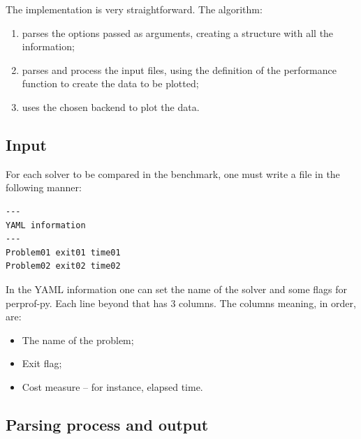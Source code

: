     The implementation is very straightforward. The algorithm:
    \begin{enumerate}
      \item parses the options passed as arguments, creating a
        structure with all the information;
      \item parses and process the input files, using the definition
        of the performance function to create the data to be plotted;
      \item uses the chosen backend to plot the data.
    \end{enumerate}

\subsection*{Input}

    For each solver to be compared in the benchmark, one must write a file in
    the following manner:

    \begin{verbatim}
---
YAML information
---
Problem01 exit01 time01
Problem02 exit02 time02
    \end{verbatim}

    In the YAML information one can set the name of the solver and some
    flags for perprof-py.
    Each line beyond that has 3 columns. The columns meaning, in order, are:
    \begin{itemize}
      \item The name of the problem;
      \item Exit flag;
      \item Cost measure -- for instance, elapsed time.
    \end{itemize}

\subsection*{Parsing process and output}

